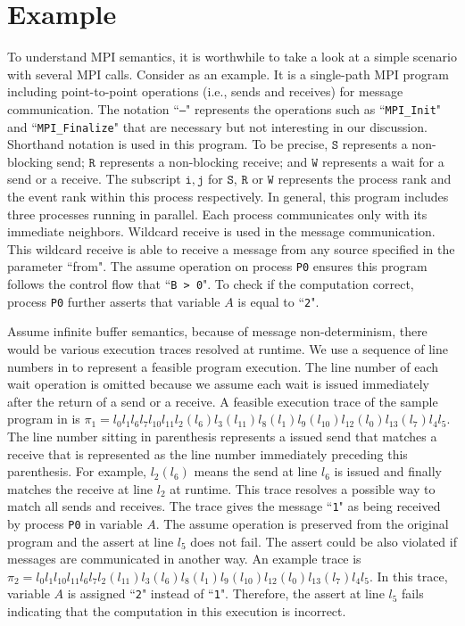 \section{Example}\label{sec:example}
To understand MPI semantics, it is worthwhile to take a look at a simple scenario with several MPI calls. Consider  as an example. It is a single-path MPI program including point-to-point operations (i.e., sends and receives) for message communication. The notation ``\texttt{---}" represents the operations such as ``\texttt{MPI\_Init}" and ``\texttt{MPI\_Finalize}" that are necessary but not interesting in our discussion. Shorthand notation is used in this program. To be precise, $\mathtt{S}$ represents a non-blocking send; $\mathtt{R}$ represents a non-blocking receive; and $\mathtt{W}$ represents a wait for a send or a receive. The subscript $\mathtt{i,j}$ for $\mathtt{S}$, $\mathtt{R}$ or $\mathtt{W}$ represents the process rank and the event rank within this process respectively.
In general, this program includes three processes running in parallel. Each process communicates only with its immediate neighbors. Wildcard receive is used in the message communication. This wildcard receive is able to receive a message from any source specified in the parameter ``from". The assume operation on process \texttt{P0} ensures this program follows the control flow that ``\texttt{B > 0}". To check if the computation correct, process \texttt{P0} further asserts that variable $A$ is equal to ``\texttt{2}".  

Assume infinite buffer semantics, because of message non-determinism, there would be various execution traces resolved at runtime. We use a sequence of line numbers in  to represent a feasible program execution. The line number of each wait operation is omitted because we assume each wait is issued immediately after the return of a send or a receive. A feasible execution trace of the sample program in  is $\pi_1 = l_0l_1l_6l_7l_{10}l_{11}l_2(l_6)l_3(l_{11})l_8(l_1)l_9(l_{10})l_{12}(l_0)l_{13}(l_7)l_4l_5$. The line number sitting in parenthesis represents a issued send that matches a receive that is represented as the line number immediately preceding this parenthesis. For example, $l_2(l_6)$ means the send at line $l_6$ is issued and finally matches the receive at line $l_2$ at runtime. This trace resolves a possible way to match all sends and receives. The trace gives the message ``\texttt{1}" as being received by process \texttt{P0} in variable $A$. The assume operation is preserved from the original program and the assert at line $l_5$ does not fail. The assert could be also violated if messages are communicated in another way. An example trace is $\pi_2 = l_0l_1l_{10}l_{11}l_6l_7l_2(l_{11})l_3(l_6)l_8(l_1)l_9(l_{10})l_{12}(l_0)l_{13}(l_7)l_4l_5$. In this trace, variable $A$ is assigned ``\texttt{2}" instead of ``\texttt{1}". Therefore, the assert at line $l_5$ fails indicating that the computation in this execution is incorrect. 

